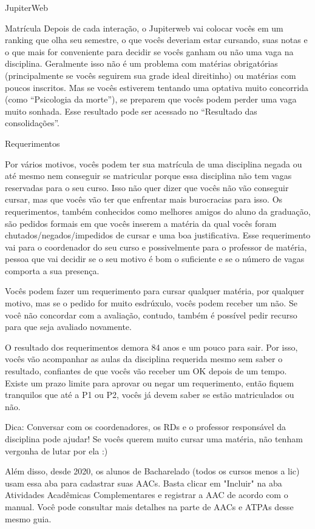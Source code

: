 \begin{secao}{JupiterWeb}
\begin{subsecao}{Matrícula}
Depois de cada interação, o Jupiterweb vai colocar vocês em um ranking que olha seu
semestre, o que vocês deveriam estar cursando, suas notas e o que mais for
conveniente para decidir se vocês ganham ou não uma vaga na disciplina.
Geralmente isso não é um problema com matérias obrigatórias (principalmente se
vocês seguirem sua grade ideal direitinho) ou matérias com poucos inscritos. Mas
se vocês estiverem tentando uma optativa muito concorrida (como ``Psicologia da
morte''), se preparem que vocês podem perder uma vaga muito sonhada.
Esse resultado pode ser acessado no ``Resultado das consolidações''.

\end{subsecao}
\begin{subsecao}{Requerimentos}

Por vários motivos, vocês podem ter sua matrícula de uma disciplina negada ou
até mesmo nem conseguir se matricular porque essa disciplina não tem vagas
reservadas para o seu curso. Isso não quer dizer que vocês não vão conseguir
cursar, mas que vocês vão ter que enfrentar mais burocracias para isso. Os
requerimentos, também conhecidos como melhores amigos do aluno da graduação,
são pedidos formais em que vocês inserem a matéria da qual vocês foram
chutados/negados/impedidos de cursar e uma boa justificativa. Esse requerimento
vai para o coordenador do seu curso e possivelmente para o professor de
matéria, pessoa que vai decidir se o seu motivo é bom o suficiente e se o
número de vagas comporta a sua presença.

Vocês podem fazer um requerimento para cursar qualquer matéria, por qualquer
motivo, mas se o pedido for muito esdrúxulo, vocês podem receber um não. Se
você não concordar com a avaliação, contudo, também é possível pedir recurso
para que seja avaliado novamente.

O resultado dos requerimentos demora 84 anos e um pouco para sair. Por isso,
vocês vão acompanhar as aulas da disciplina requerida mesmo sem saber o
resultado, confiantes de que vocês vão receber um OK depois de um tempo. Existe
um prazo limite para aprovar ou negar um requerimento, então fiquem tranquilos
que até a P1 ou P2, vocês já devem saber se estão matriculados ou não.

Dica: Conversar com os coordenadores, os RDs e o professor responsável da disciplina
pode ajudar! Se vocês querem muito cursar uma matéria, não tenham vergonha de
lutar por ela :)

Além disso, desde 2020, os alunos de Bacharelado (todos os cursos menos a lic) usam
essa aba para cadastrar suas AACs. Basta clicar em "Incluir" na aba Atividades Acadêmicas
Complementares e registrar a AAC de acordo com o manual. Você pode consultar mais detalhes
na parte de AACs e ATPAs desse mesmo guia.

\end{subsecao}

\end{secao}

